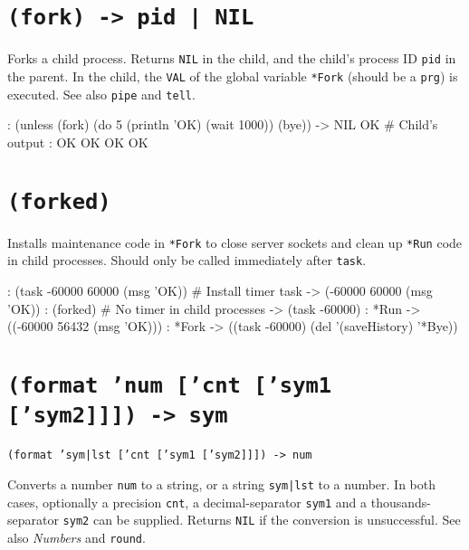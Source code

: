  
\section*{\texttt{(fork) -> pid | NIL}}
\label{sec:func-ref-F-(fork) -> pid | NIL}


Forks a child process. Returns \texttt{NIL} in the child, and the child's
process ID \texttt{pid} in the parent. In the child, the \texttt{VAL} of the global
variable \texttt{*Fork} (should be a \texttt{prg}) is executed. See also \texttt{pipe} and
\texttt{tell}.


\begin{wideverbatim}
: (unless (fork) (do 5 (println 'OK) (wait 1000)) (bye))
-> NIL
OK                                              # Child's output
: OK
OK
OK
OK
\end{wideverbatim}

 
\section*{\texttt{(forked)}}
\label{sec:func-ref-F-(forked)}


Installs maintenance code in \texttt{*Fork} to close server sockets and clean
up \texttt{*Run} code in child processes. Should only be called immediately
after \texttt{task}.


\begin{wideverbatim}
: (task -60000 60000 (msg 'OK))     # Install timer task
-> (-60000 60000 (msg 'OK))
: (forked)                          # No timer in child processes
-> (task -60000)
: *Run
-> ((-60000 56432 (msg 'OK)))
: *Fork
-> ((task -60000) (del '(saveHistory) '*Bye))
\end{wideverbatim}

 
\section*{\texttt{(format 'num ['cnt ['sym1 ['sym2]]]) -> sym}}
\label{sec:func-ref-F-(format 'num ['cnt ['sym1 ['sym2]]]) -> sym}


\texttt{(format 'sym|lst ['cnt ['sym1 ['sym2]]]) -> num}

Converts a number \texttt{num} to a string, or a string \texttt{sym|lst} to a number.
In both cases, optionally a precision \texttt{cnt}, a decimal-separator \texttt{sym1}
and a thousands-separator \texttt{sym2} can be supplied. Returns \texttt{NIL} if the
conversion is unsuccessful. See also \emph{Numbers} and
\texttt{round}.



